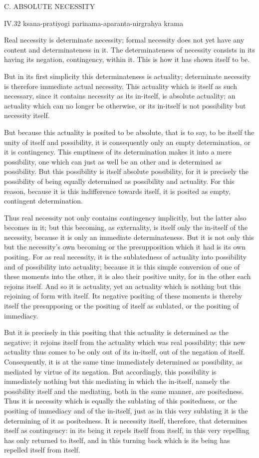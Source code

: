 C. ABSOLUTE NECESSITY

IV.32
ksana-pratiyogi parinama-aparanta-nirgrahya krama

Real necessity is determinate necessity;
formal necessity does not yet have any content and determinateness in it.
The determinateness of necessity consists in
its having its negation, contingency, within it.
This is how it has shown itself to be.

But in its first simplicity this determinateness is actuality;
determinate necessity is therefore immediate actual necessity.
This actuality which is itself as such necessary,
since it contains necessity as its in-itself, is absolute actuality;
an actuality which can no longer be otherwise,
or its in-itself is not possibility but necessity itself.

But because this actuality is posited to be absolute,
that is to say, to be itself the unity of itself and possibility,
it is consequently only an empty determination, or it is contingency.
This emptiness of its determination makes it into a mere possibility,
one which can just as well be an other and is determined as possibility.
But this possibility is itself absolute possibility,
for it is precisely the possibility of being
equally determined as possibility and actuality.
For this reason, because it is this indifference towards itself,
it is posited as empty, contingent determination.

Thus real necessity not only contains contingency implicitly,
but the latter also becomes in it;
but this becoming, as externality,
is itself only the in-itself of the necessity,
because it is only an immediate determinateness.
But it is not only this but the necessity's own becoming
or the presupposition which it had is its own positing.
For as real necessity, it is the sublatedness
of actuality into possibility and of possibility into actuality;
because it is this simple conversion of one of these moments into the other,
it is also their positive unity, for in the other each rejoins itself.
And so it is actuality, yet an actuality
which is nothing but this rejoining of form with itself.
Its negative positing of these moments is thereby itself the presupposing
or the positing of itself as sublated, or the positing of immediacy.

But it is precisely in this positing that
this actuality is determined as the negative;
it rejoins itself from the actuality which was real possibility;
this new actuality thus comes to be only out of its in-itself,
out of the negation of itself.
Consequently, it is at the same time immediately determined
as possibility, as mediated by virtue of its negation.
But accordingly, this possibility is immediately nothing but
this mediating in which the in-itself,
namely the possibility itself and the mediating,
both in the same manner, are positedness.
Thus it is necessity which is equally the sublating of this positedness,
or the positing of immediacy and of the in-itself,
just as in this very sublating it is the determining of it as positedness.
It is necessity itself, therefore, that determines itself as contingency:
in its being it repels itself from itself,
in this very repelling has only returned to itself,
and in this turning back which is its being has repelled itself from itself.


